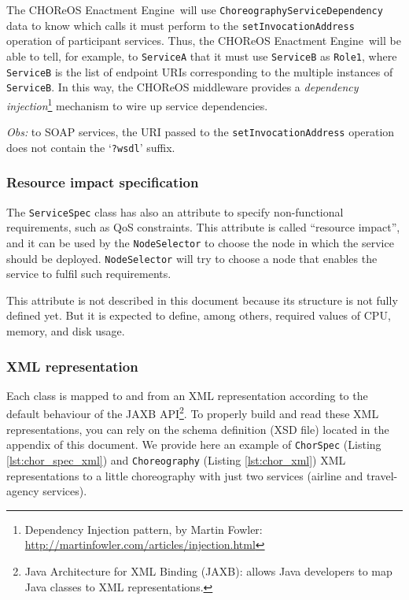 \documentclass[a4paper, 10pt]{article}
\newcommand{\ee}{CHOReOS Enactment Engine}
\begin{document}
The \ee\ will use \verb!ChoreographyServiceDependency! data to know which calls it must perform to the  \verb!setInvocationAddress! operation of participant services. Thus, the \ee\ will be able to tell, for example, to \verb!ServiceA! that it must use \verb!ServiceB! as \verb!Role1!, where \verb!ServiceB! is the list of endpoint URIs corresponding to the multiple instances of \verb!ServiceB!. In this way, the CHOReOS middleware provides a \emph{dependency injection}\footnote{Dependency Injection pattern, by Martin Fowler: \url{http://martinfowler.com/articles/injection.html}} mechanism to wire up service dependencies.

\emph{Obs:} to SOAP services, the URI passed to the \texttt{setInvocationAddress} operation does not contain the `\texttt{?wsdl}' suffix.

\subsubsection*{Resource impact specification}

The \verb!ServiceSpec! class has also an attribute to specify non-functional requirements, such as QoS constraints. This attribute is called ``resource impact'', and it can be used by the \verb!NodeSelector! to choose the node in which the service should be deployed. \verb!NodeSelector! will try to choose a node that enables the service to fulfil such requirements.

This attribute is not described in this document because its structure is not fully defined yet. But it is expected to define, among others, required values of CPU, memory, and disk usage.

\subsubsection*{XML representation}

Each class is mapped to and from an XML representation according to the default behaviour of the JAXB API\footnote{Java Architecture for XML Binding (JAXB): allows Java developers to map Java classes to XML representations.}. 
To properly build and read these XML representations, you can rely on the schema definition (XSD file) located in the appendix of this document. We provide here an example of \verb!ChorSpec! (Listing \ref{lst:chor_spec_xml}) and \verb!Choreography! (Listing \ref{lst:chor_xml}) XML representations to a little choreography with just two services (airline and travel-agency services). 
\end{document}
